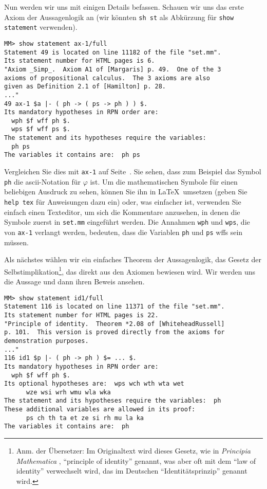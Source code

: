 Nun werden wir uns mit einigen Details befassen.  Schauen wir uns das erste Axiom der Aussagenlogik an (wir könnten \texttt{sh st} als Abkürzung für \texttt{show statement} verwenden).

\begin{verbatim}
MM> show statement ax-1/full
Statement 49 is located on line 11182 of the file "set.mm".
Its statement number for HTML pages is 6.
"Axiom _Simp_.  Axiom A1 of [Margaris] p. 49.  One of the 3
axioms of propositional calculus.  The 3 axioms are also
given as Definition 2.1 of [Hamilton] p. 28.
..."
49 ax-1 $a |- ( ph -> ( ps -> ph ) ) $.
Its mandatory hypotheses in RPN order are:
  wph $f wff ph $.
  wps $f wff ps $.
The statement and its hypotheses require the variables:
  ph ps
The variables it contains are:  ph ps
\end{verbatim}

Vergleichen Sie dies mit \texttt{ax-1} auf Seite~\pageref{ax1}.  Sie sehen, dass zum Beispiel das Symbol \texttt{ph} die {\sc ascii}-Notation für $\varphi$ ist.  Um die mathematischen Symbole für einen beliebigen Ausdruck zu sehen, können Sie ihn in \LaTeX\ umsetzen (geben Sie \texttt{help tex} für Anweisungen dazu ein) oder, was einfacher ist, verwenden Sie einfach einen Texteditor, um sich die Kommentare anzusehen, in denen die Symbole zuerst in \texttt{set.mm} eingeführt werden.  Die Annahmen \texttt{wph} und \texttt{wps}, die von \texttt{ax-1} verlangt werden, bedeuten, dass die Variablen \texttt{ph} und \texttt{ps} wffs sein müssen.

Als nächstes wählen wir ein einfaches Theorem der Aussagenlogik, das Gesetz der Selbstimplikation\footnote{Anm. der Übersetzer: Im Originaltext wird dieses Gesetz, wie in {\em Principia Mathematica} \cite{PM}, "`principle of identity"' genannt, was aber oft mit dem "`law of identity"' verwechselt wird, das im Deutschen "`Identitätsprinzip"' genannt wird.}, das direkt aus den Axiomen bewiesen wird.  Wir werden uns die Aussage und dann ihren Beweis ansehen.

\begin{verbatim}
MM> show statement id1/full
Statement 116 is located on line 11371 of the file "set.mm".
Its statement number for HTML pages is 22.
"Principle of identity.  Theorem *2.08 of [WhiteheadRussell]
p. 101.  This version is proved directly from the axioms for
demonstration purposes.
..."
116 id1 $p |- ( ph -> ph ) $= ... $.
Its mandatory hypotheses in RPN order are:
  wph $f wff ph $.
Its optional hypotheses are:  wps wch wth wta wet
      wze wsi wrh wmu wla wka
The statement and its hypotheses require the variables:  ph
These additional variables are allowed in its proof:
      ps ch th ta et ze si rh mu la ka
The variables it contains are:  ph
\end{verbatim}


